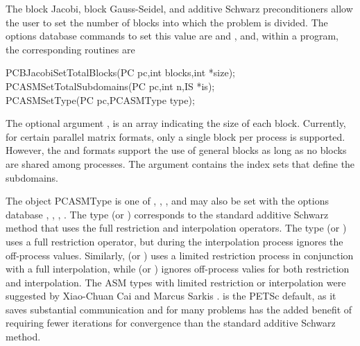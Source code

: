 The block Jacobi, block Gauss-Seidel, and additive Schwarz 
preconditioners allow the user
to set the number of blocks into which the problem is divided.  The
options database commands to set this value are  
and  , and, within a program, the corresponding routines
are  
  
\begin{tabbing}
  PCBJacobiSetTotalBlocks(PC pc,int blocks,int *size);\\
  PCASMSetTotalSubdomains(PC pc,int n,IS *is);\\
  PCASMSetType(PC pc,PCASMType type);
\end{tabbing}
The 
optional argument , is an array indicating the size of
each block. Currently, for certain parallel matrix formats, only a
single block per process is supported. However, the  and 
 formats
support the use of general blocks as long as no blocks are shared
among processes. The  argument contains the index sets that
define the subdomains. 

The object PCASMType is one of ,
, , 
and may also be set with the options database 
 \trl{[basic}, , , \trl{none]}.
   
  
The type  (or  ) corresponds to the
standard additive Schwarz method that uses the full restriction and
interpolation operators.
The type  (or  ) uses a full
restriction operator, but during the interpolation process ignores the off-process
values.
Similarly,  (or  ) uses a limited
restriction process in conjunction with a full interpolation, while
 (or  ) ignores off-process valies
for both restriction and interpolation.
The ASM types with limited restriction or interpolation were suggested by 
Xiao-Chuan Cai and Marcus Sarkis \cite{cs97a}.    
 is the PETSc default, as it saves substantial communication
and for many problems has the added benefit of requiring fewer iterations for convergence
than the standard additive Schwarz method.

